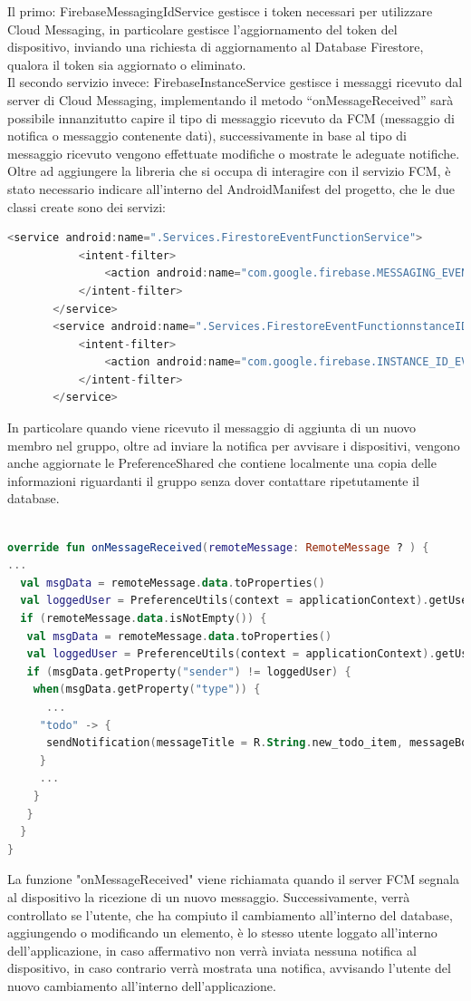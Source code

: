Il primo: FirebaseMessagingIdService gestisce i token necessari per utilizzare Cloud Messaging, in particolare gestisce l'aggiornamento del token del dispositivo, inviando una richiesta di aggiornamento al Database Firestore, qualora il token sia aggiornato o eliminato.\\
Il secondo servizio invece: FirebaseInstanceService gestisce i messaggi ricevuto dal server di Cloud Messaging, implementando il metodo ``onMessageReceived'' sarà possibile innanzitutto capire il tipo di messaggio ricevuto da FCM (messaggio di notifica o messaggio contenente dati), successivamente in base al tipo di messaggio ricevuto vengono effettuate modifiche o mostrate le adeguate notifiche.\\
Oltre ad aggiungere la libreria che si occupa di interagire con il servizio FCM, è stato necessario indicare all'interno del AndroidManifest del progetto, che le due classi create sono dei servizi:
\begin{lstlisting}[language=kotlin,caption={Android Manifest - I servizi FCM}]
<service android:name=".Services.FirestoreEventFunctionService">
           <intent-filter>
               <action android:name="com.google.firebase.MESSAGING_EVENT" />
           </intent-filter>
       </service>
       <service android:name=".Services.FirestoreEventFunctionnstanceIDService">
           <intent-filter>
               <action android:name="com.google.firebase.INSTANCE_ID_EVENT" />
           </intent-filter>
       </service>
       \end{lstlisting}
In particolare quando viene ricevuto il messaggio di aggiunta di un nuovo membro nel gruppo, oltre ad inviare la notifica per avvisare i dispositivi, vengono anche aggiornate le PreferenceShared che contiene localmente una copia delle informazioni riguardanti il gruppo senza dover contattare ripetutamente il database.\\

\begin{lstlisting}[language=kotlin,caption={Metodo onMessageReceived}]

override fun onMessageReceived(remoteMessage: RemoteMessage ? ) {
...
  val msgData = remoteMessage.data.toProperties()
  val loggedUser = PreferenceUtils(context = applicationContext).getUserUID()
  if (remoteMessage.data.isNotEmpty()) {
   val msgData = remoteMessage.data.toProperties()
   val loggedUser = PreferenceUtils(context = applicationContext).getUserUID()
   if (msgData.getProperty("sender") != loggedUser) {
    when(msgData.getProperty("type")) {
      ...
     "todo" -> {
      sendNotification(messageTitle = R.String.new_todo_item, messageBody = msgData.getProperty("name"))
     }
     ...
    }
   }
  }
}
\end{lstlisting}
La funzione "onMessageReceived" viene richiamata quando il server FCM segnala al dispositivo la ricezione di un nuovo messaggio. Successivamente, verrà controllato se l'utente, che ha compiuto il cambiamento all'interno del database, aggiungendo o modificando un elemento, è lo stesso utente loggato all'interno dell'applicazione, in caso affermativo non verrà inviata nessuna notifica al dispositivo, in caso contrario verrà mostrata una notifica, avvisando l'utente del nuovo cambiamento all'interno dell'applicazione.

